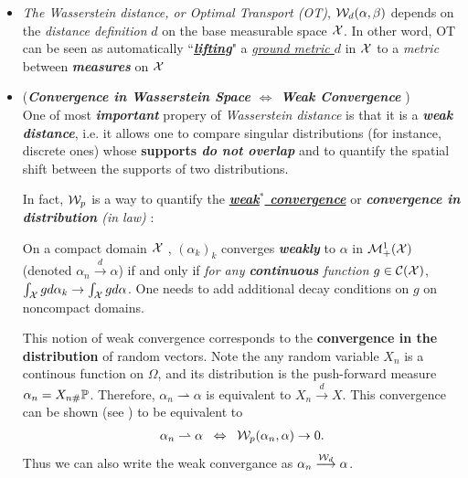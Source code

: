 \documentclass[11pt]{article}
\begin{document}
\begin{itemize}
\item \begin{remark}
\emph{The Wasserstein distance, or Optimal Transport (OT)}, ${\mathcal W}_{d}(\alpha, \beta)$ depends on the \emph{distance definition} $d$ on the base measurable space ${\mathcal X}$. In other word, OT can be seen as automatically ``\underline{\textbf{\emph{lifting}}}" a \underline{\emph{ground metric $d$}} in ${\mathcal X}$ to a \emph{metric} between \textbf{\emph{measures}} on ${\mathcal X}$
\end{remark}

\item \begin{remark} (\textbf{\emph{Convergence in Wasserstein Space $\Leftrightarrow$ Weak Convergence}} ) \citep{villani2009optimal, santambrogio2015optimal, gabriel2019computational} \\
One of most \textbf{\emph{important}} propery of \emph{Wasserstein distance} is that  it is a \emph{\textbf{weak distance}}, i.e. it allows one to compare singular distributions (for instance, discrete ones) whose \textbf{supports \emph{do not overlap}} and to quantify the spatial shift between the supports of two distributions. 

In fact, ${\mathcal W}_{p}$ is a way to quantify the \underline{\emph{\textbf{weak$^{*}$ convergence}}} or \emph{\textbf{convergence in distribution} (in law)} \citep{villani2009optimal}: 
\begin{definition}
On a compact domain ${\mathcal X}$ , $(\alpha_k)_k$ converges \textbf{\textit{weakly}} to $\alpha$ in ${\mathcal M}_{+}^{1}({\mathcal X})$ (denoted $\alpha_{n}\stackrel{d}{\rightarrow} \alpha$) if and only if \emph{for any \textbf{continuous} function} $g \in {\mathcal C}({\mathcal X})$, $\int_{{\mathcal X}} g d\alpha_k \rightarrow \int_{{\mathcal X}} g d\alpha$. One needs to add additional decay conditions on $g$ on noncompact domains. 
\end{definition}

This notion of weak convergence corresponds to the \textbf{convergence in the distribution} of random vectors. Note the any random variable $X_{n}$ is a continous function on $\Omega$, and its distribution is the push-forward measure $\alpha_{n} = X_{n\#}{\mathbb P}$. Therefore, $\alpha_{n}  \rightharpoonup \alpha$  is equivalent to $X_{n}\stackrel{d}{\rightarrow} X$. This convergence can be shown (see \citep{villani2009optimal, santambrogio2015optimal}) to be equivalent to 
\begin{align*}
\alpha_{n} \rightharpoonup \alpha \;\; \Leftrightarrow \;\;{\mathcal W}_{p}(\alpha_{n}, \alpha) \rightarrow 0.
\end{align*}
Thus we can also write the weak convergance as $\alpha_{n}\stackrel{{\mathcal W}_{d}}{\longrightarrow} \alpha$.
\end{remark}
\end{itemize}
\end{document}
